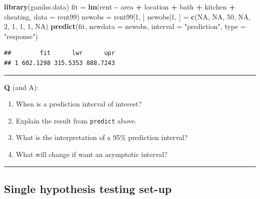 \documentclass[
]{article}
\newenvironment{Shaded}{\begin{snugshade}}{\end{snugshade}}
\newcommand{\AttributeTok}[1]{\textcolor[rgb]{0.13,0.29,0.53}{#1}}
\newcommand{\ConstantTok}[1]{\textcolor[rgb]{0.56,0.35,0.01}{#1}}
\newcommand{\DecValTok}[1]{\textcolor[rgb]{0.00,0.00,0.81}{#1}}
\newcommand{\FunctionTok}[1]{\textcolor[rgb]{0.13,0.29,0.53}{\textbf{#1}}}
\newcommand{\NormalTok}[1]{#1}
\newcommand{\OtherTok}[1]{\textcolor[rgb]{0.56,0.35,0.01}{#1}}
\newcommand{\SpecialCharTok}[1]{\textcolor[rgb]{0.81,0.36,0.00}{\textbf{#1}}}
\newcommand{\StringTok}[1]{\textcolor[rgb]{0.31,0.60,0.02}{#1}}
\providecommand{\tightlist}{%
  \setlength{\itemsep}{0pt}\setlength{\parskip}{0pt}}
\begin{document}
\begin{Shaded}
\begin{Highlighting}[]
\FunctionTok{library}\NormalTok{(gamlss.data)}
\NormalTok{fit }\OtherTok{=} \FunctionTok{lm}\NormalTok{(rent }\SpecialCharTok{\textasciitilde{}}\NormalTok{ area }\SpecialCharTok{+}\NormalTok{ location }\SpecialCharTok{+}\NormalTok{ bath }\SpecialCharTok{+}\NormalTok{ kitchen }\SpecialCharTok{+}\NormalTok{ cheating, }\AttributeTok{data =}\NormalTok{ rent99)}
\NormalTok{newobs }\OtherTok{=}\NormalTok{ rent99[}\DecValTok{1}\NormalTok{, ]}
\NormalTok{newobs[}\DecValTok{1}\NormalTok{, ] }\OtherTok{=} \FunctionTok{c}\NormalTok{(}\ConstantTok{NA}\NormalTok{, }\ConstantTok{NA}\NormalTok{, }\DecValTok{50}\NormalTok{, }\ConstantTok{NA}\NormalTok{, }\DecValTok{2}\NormalTok{, }\DecValTok{1}\NormalTok{, }\DecValTok{1}\NormalTok{, }\DecValTok{1}\NormalTok{, }\ConstantTok{NA}\NormalTok{)}
\FunctionTok{predict}\NormalTok{(fit, }\AttributeTok{newdata =}\NormalTok{ newobs, }\AttributeTok{interval =} \StringTok{"prediction"}\NormalTok{, }\AttributeTok{type =} \StringTok{"response"}\NormalTok{)}
\end{Highlighting}
\end{Shaded}

\begin{verbatim}
##        fit      lwr      upr
## 1 602.1298 315.5353 888.7243
\end{verbatim}

\begin{center}\rule{0.5\linewidth}{0.5pt}\end{center}

\textbf{Q} (and A):

\begin{enumerate}
\def\labelenumi{\arabic{enumi}.}
\tightlist
\item
  When is a prediction interval of interest?
\item
  Explain the result from \texttt{predict} above.
\item
  What is the interpretation of a 95\% prediction interval?
\item
  What will change if want an asymptotic interval?
\end{enumerate}

\begin{center}\rule{0.5\linewidth}{0.5pt}\end{center}

\hypertarget{single-hypothesis-testing-set-up}{%
\subsection{Single hypothesis testing
set-up}\label{single-hypothesis-testing-set-up}}
\end{document}
